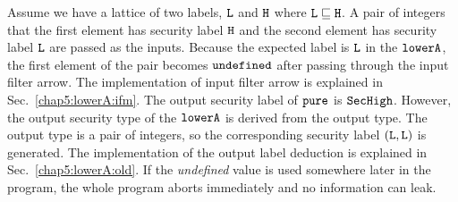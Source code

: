 \documentclass{report}
\newcommand{\co}[1]{$\cod{#1}$}
\begin{document}

%
%
Assume we have a lattice of two labels, \co{L} and \co{H} where $\mathtt{L}\sqsubseteq \mathtt{H}$. A pair of 
integers that the first element has security label \co{H} and the second element has security label \co{L} are 
passed as the inputs.
Because the expected label is \co{L} in the \co{lowerA}, the first element of the pair becomes \co{undefined}
after passing through the input filter arrow. The implementation of input filter arrow is explained in
Sec.~\ref{chap5:lowerA:ifm}. The output security label of \co{pure} is \co{SecHigh}. However, the output
security type of the \co{lowerA} is derived from the output type. The output type is a pair of integers, so
the corresponding security label $(\mathtt{L},\mathtt{L})$ is generated. The implementation of the output label
deduction is explained in Sec.~\ref{chap5:lowerA:old}.
If the {\em undefined} value is used somewhere later in the program, the whole program
aborts immediately and no information can leak.
\end{document}
